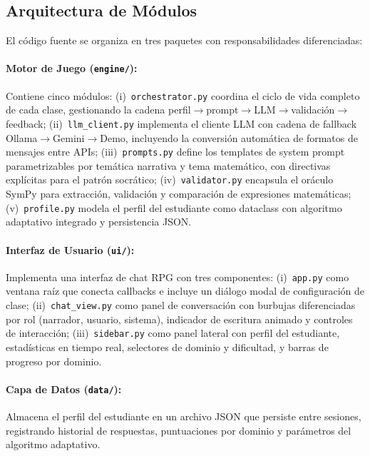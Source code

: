 \documentclass{ieeetj}
\begin{document}
\subsection{Arquitectura de M\'odulos}

El c\'odigo fuente se organiza en tres paquetes con responsabilidades diferenciadas:

\paragraph{Motor de Juego (\texttt{engine/}):} Contiene cinco m\'odulos:
(i)~\texttt{orchestrator.py} coordina el ciclo de vida completo de cada clase, gestionando la cadena perfil$\rightarrow$prompt$\rightarrow$LLM$\rightarrow$validaci\'on$\rightarrow$feedback;
(ii)~\texttt{llm\_client.py} implementa el cliente LLM con cadena de fallback Ollama$\rightarrow$Gemini$\rightarrow$Demo, incluyendo la conversi\'on autom\'atica de formatos de mensajes entre APIs;
(iii)~\texttt{prompts.py} define los templates de system prompt parametrizables por tem\'atica narrativa y tema matem\'atico, con directivas expl\'icitas para el patr\'on socr\'atico;
(iv)~\texttt{validator.py} encapsula el or\'aculo SymPy para extracci\'on, validaci\'on y comparaci\'on de expresiones matem\'aticas;
(v)~\texttt{profile.py} modela el perfil del estudiante como dataclass con algoritmo adaptativo integrado y persistencia JSON.

\paragraph{Interfaz de Usuario (\texttt{ui/}):} Implementa una interfaz de chat RPG con tres componentes: (i)~\texttt{app.py} como ventana ra\'iz que conecta callbacks e incluye un di\'alogo modal de configuraci\'on de clase; (ii)~\texttt{chat\_view.py} como panel de conversaci\'on con burbujas diferenciadas por rol (narrador, usuario, sistema), indicador de escritura animado y controles de interacci\'on; (iii)~\texttt{sidebar.py} como panel lateral con perfil del estudiante, estad\'isticas en tiempo real, selectores de dominio y dificultad, y barras de progreso por dominio.

\paragraph{Capa de Datos (\texttt{data/}):} Almacena el perfil del estudiante en un archivo JSON que persiste entre sesiones, registrando historial de respuestas, puntuaciones por dominio y par\'ametros del algoritmo adaptativo.
\end{document}
